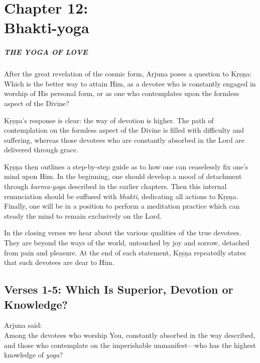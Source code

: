 \chapter{Chapter 12: \\Bhakti-yoga}\label{chap-bhakti-yoga}

\paragraph*{\MakeUppercase{The Yoga of Love}}

\noindent After the great revelation of the cosmic form, Arjuna poses a question to Kṛṣṇa: Which is the better way to attain Him, as a devotee who is constantly engaged in worship of His personal form, or as one who contemplates upon the formless aspect of the Divine?

Kṛṣṇa's response is clear: the way of devotion is higher. The path of contemplation on the formless aspect of the Divine is filled with difficulty and suffering, whereas those devotees who are constantly absorbed in the Lord are delivered through grace.

Kṛṣṇa then outlines a step-by-step guide as to how one can ceaselessly fix one’s mind upon Him. In the beginning, one should develop a mood of detachment through \textit{karma-yoga} described in the earlier chapters. Then this internal renunciation should be suffused with \textit{bhakti}, dedicating all actions to Kṛṣṇa. Finally, one will be in a position to perform a meditation practice which can steady the mind to remain exclusively on the Lord.

In the closing verses we hear about the various qualities of the true devotees. They are beyond the ways of the world, untouched by joy and sorrow, detached from pain and pleasure. At the end of each statement, Kṛṣṇa repeatedly states that such devotees are dear to Him.

\section{Verses 1-5: Which Is Superior, Devotion or Knowledge?}\label{sec-verses-1-5-which-is-superior-devotion-or-knowledge}

{\hspace*{1em}Arjuna said: \\
Among the devotees who worship You, constantly absorbed in the way described, and those who contemplate on the imperishable unmanifest---who has the highest knowledge of \textit{yoga}?}

